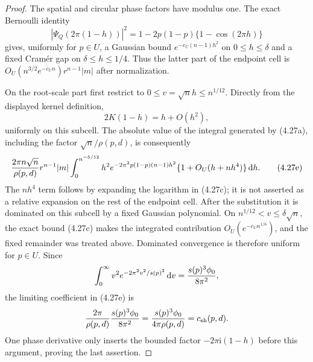 \documentclass[11pt,a4paper]{article}
\numberwithin{equation}{section}
\theoremstyle{definition}
\theoremstyle{remark}
\newcommand{\ii}{\mathrm i}
\newcommand{\dd}{\,\mathrm d}
\begin{document}
\begin{proof}
The spatial and circular phase factors have modulus one.  The exact
Bernoulli identity
\[
 |\Psi_Q(2\pi(1-h))|^2
 =1-2p(1-p)\{1-\cos(2\pi h)\}                         \tag{4.27c}
\]
gives, uniformly for $p\in U$, a Gaussian bound $e^{-c_U(n-1)h^2}$
on $0\le h\le\delta$ and a fixed Cram\'er gap on
$\delta\le h\le1/4$.  Thus the latter part of the endpoint cell is
$O_U(n^{3/2}e^{-c_Un})r^{n-1}|m|$ after normalization.

On the root-scale part first restrict to $0\le v=\sqrt n h\le n^{1/12}$.
Directly from the displayed
kernel definition,
\[
 2K(1-h)=h+O(h^2),                                    \tag{4.27d}
\]
uniformly on this subcell.  The absolute value of the integral generated by
(4.27a), including the factor $\sqrt n/\rho(p,d)$, is consequently
\[
 {2\pi n\sqrt n\over\rho(p,d)}r^{n-1}|m|
 \int_0^{n^{-5/12}}h^2
 e^{-2\pi^2p(1-p)(n-1)h^2}\{1+O_U(h+n h^4)\}\dd h.   \tag{4.27e}
\]
The $nh^4$ term follows by expanding the logarithm in (4.27c); it is not
asserted as a relative expansion on the rest of the endpoint cell.  After
the substitution it is dominated on this subcell by a fixed Gaussian
polynomial.  On $n^{1/12}<v\le\delta\sqrt n$, the exact bound (4.27c)
makes the integrated contribution $O_U(e^{-c_Un^{1/6}})$, and the fixed
remainder was treated above.  Dominated convergence is therefore uniform
for $p\in U$.  Since
\[
 \int_0^\infty v^2e^{-2\pi^2v^2/s(p)^2}\dd v
       ={s(p)^3\phi_0\over8\pi^2},
\]
the limiting coefficient in (4.27e) is
\[
 {2\pi\over\rho(p,d)}{s(p)^3\phi_0\over8\pi^2}
       ={s(p)^3\phi_0\over4\pi\rho(p,d)}
       =c_{\rm sh}(p,d).
\]
One phase derivative only inserts the bounded factor
$-2\pi\ii(1-h)$ before this argument, proving the last assertion.
\end{proof}
\end{document}
